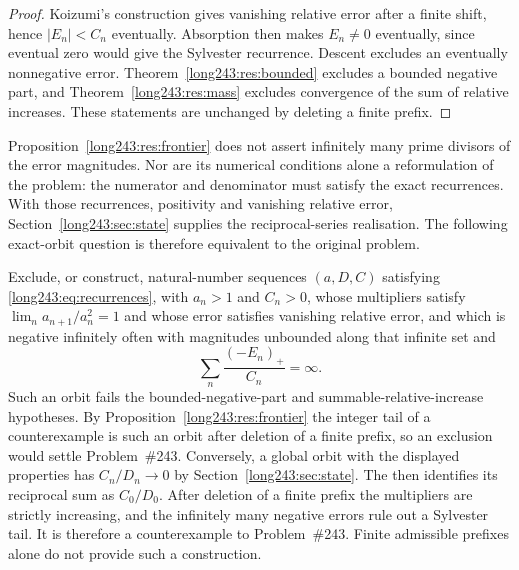 \begin{proof}
Koizumi's construction gives vanishing relative error after a finite
shift, hence $|E_n|<C_n$ eventually.
Absorption then makes $E_n\ne0$ eventually,
since eventual zero would give the Sylvester recurrence.  Descent excludes an
eventually nonnegative error.  Theorem~\ref{long243:res:bounded} excludes a bounded
negative part, and Theorem~\ref{long243:res:mass} excludes convergence of the sum of relative increases.  These statements are unchanged by deleting a finite prefix.
\end{proof}



Proposition~\ref{long243:res:frontier} does not assert infinitely many
prime divisors of the error magnitudes. Nor are its numerical conditions
alone a reformulation of the problem: the numerator and denominator
must satisfy the exact recurrences. With those recurrences, positivity
and vanishing relative error, Section~\ref{long243:sec:state} supplies
the reciprocal-series realisation. The following exact-orbit question
is therefore equivalent to the original problem.

\begin{problem}\label{long243:res:excursions}
Exclude, or construct, natural-number sequences $(a,D,C)$ satisfying
\eqref{long243:eq:recurrences}, with $a_n>1$ and
$C_n>0$, whose multipliers satisfy $\lim_n a_{n+1}/a_n^{2}=1$ and whose error satisfies vanishing relative error, and which is
negative infinitely often with magnitudes unbounded along that infinite set and
\[
 \sum_n\frac{(-E_n)_+}{C_n}=\infty .
\]
Such an orbit fails the bounded-negative-part and summable-relative-increase
hypotheses.
By Proposition~\ref{long243:res:frontier} the integer tail of a counterexample is
such an orbit after deletion of a finite prefix, so an exclusion would settle
Problem~\#243. Conversely, a global orbit with the displayed properties
has $C_n/D_n\to0$ by Section~\ref{long243:sec:state}. The
 then identifies its reciprocal sum as $C_0/D_0$.
After deletion of a finite prefix the multipliers are strictly increasing,
and the infinitely many negative errors rule out a Sylvester tail.
It is therefore a counterexample to Problem~\#243. Finite admissible
prefixes alone do not provide such a construction.
\end{problem}

